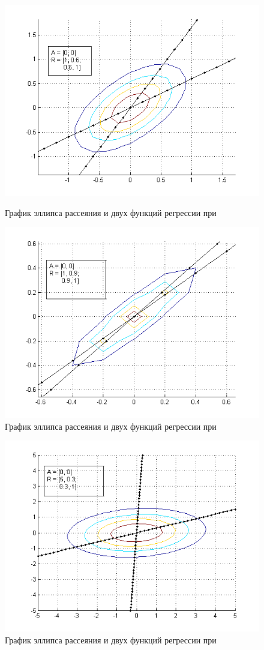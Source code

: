 \begin{figure}[h]
  \begin{minipage}[h]{0.49\linewidth}
    \includegraphics[width=1\linewidth]{../pic/new/normal_regr_3}
    \caption{График эллипса рассеяния и двух функций регрессии при}
  \end{minipage}
  \hfill
  \begin{minipage}[h]{0.49\linewidth}
    \vspace{4mm}
    \includegraphics[width=1\linewidth]{../pic/new/normal_regr_4}
    \caption{График эллипса рассеяния и двух функций регрессии при}
  \end{minipage}
\end{figure}

\begin{figure}[h]
  \centering
  \includegraphics[width=0.6\linewidth]{../pic/new/normal_regr_5}
  \caption{График эллипса рассеяния и двух функций регрессии при}\label{pic:normal_regr_end}
\end{figure}

\newpage
